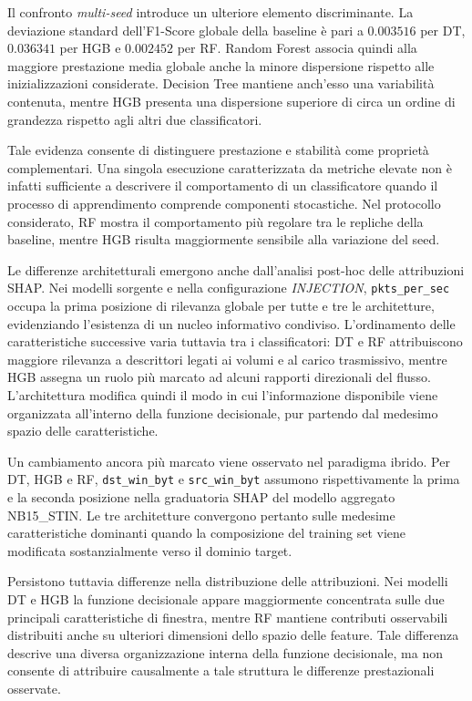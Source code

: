 Il confronto \textit{multi-seed} introduce un ulteriore elemento discriminante.
La deviazione standard dell'F1-Score globale della baseline è pari a $0.003516$ per DT, $0.036341$ per HGB e $0.002452$ per RF.
Random Forest associa quindi alla maggiore prestazione media globale anche la minore dispersione rispetto alle inizializzazioni considerate.
Decision Tree mantiene anch'esso una variabilità contenuta, mentre HGB presenta una dispersione superiore di circa un ordine di grandezza rispetto agli altri due classificatori.

Tale evidenza consente di distinguere prestazione e stabilità come proprietà complementari.
Una singola esecuzione caratterizzata da metriche elevate non è infatti sufficiente a descrivere il comportamento di un classificatore quando il processo di apprendimento comprende componenti stocastiche.
Nel protocollo considerato, RF mostra il comportamento più regolare tra le repliche della baseline, mentre HGB risulta maggiormente sensibile alla variazione del seed.

Le differenze architetturali emergono anche dall'analisi post-hoc delle attribuzioni SHAP.
Nei modelli sorgente e nella configurazione \textit{INJECTION}, \texttt{pkts\_per\_sec} occupa la prima posizione di rilevanza globale per tutte e tre le architetture, evidenziando l'esistenza di un nucleo informativo condiviso.
L'ordinamento delle caratteristiche successive varia tuttavia tra i classificatori: DT e RF attribuiscono maggiore rilevanza a descrittori legati ai volumi e al carico trasmissivo, mentre HGB assegna un ruolo più marcato ad alcuni rapporti direzionali del flusso.
L'architettura modifica quindi il modo in cui l'informazione disponibile viene organizzata all'interno della funzione decisionale, pur partendo dal medesimo spazio delle caratteristiche.

Un cambiamento ancora più marcato viene osservato nel paradigma ibrido.
Per DT, HGB e RF, \texttt{dst\_win\_byt} e \texttt{src\_win\_byt} assumono rispettivamente la prima e la seconda posizione nella graduatoria SHAP del modello aggregato NB15\_STIN.
Le tre architetture convergono pertanto sulle medesime caratteristiche dominanti quando la composizione del training set viene modificata sostanzialmente verso il dominio target.

Persistono tuttavia differenze nella distribuzione delle attribuzioni.
Nei modelli DT e HGB la funzione decisionale appare maggiormente concentrata sulle due principali caratteristiche di finestra, mentre RF mantiene contributi osservabili distribuiti anche su ulteriori dimensioni dello spazio delle feature.
Tale differenza descrive una diversa organizzazione interna della funzione decisionale, ma non consente di attribuire causalmente a tale struttura le differenze prestazionali osservate.

